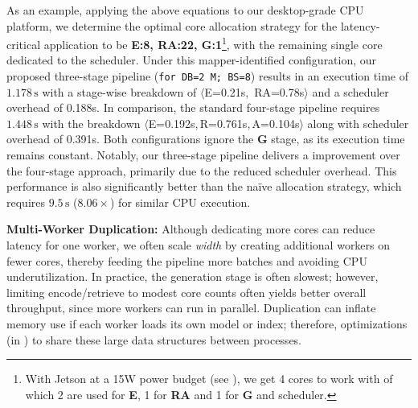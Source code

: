 As an example, applying the above equations to our desktop-grade CPU platform, we determine the optimal core allocation strategy for the latency-critical application to be \textbf{E:8, RA:22, G:1}\footnote{With Jetson at a 15W power budget (see ), we get 4 cores to work with of which 2 are used for \textbf{E}, 1 for \textbf{RA} and 1 for \textbf{G} and scheduler.}, with the remaining single core dedicated to the scheduler. Under this mapper-identified configuration, our proposed three-stage pipeline (\texttt{for DB=2\,M; BS=8}) results in an execution time of $1.178\,\mathrm{s}$ with a stage-wise breakdown of $\langle$E=0.21s,\, RA=0.78s$\rangle$ and a scheduler overhead of 0.188s. In comparison, the standard four-stage pipeline requires $1.448\,\mathrm{s}$ with the breakdown $\langle$E=0.192s,\,R=0.761s,\,A=0.104s$\rangle$ along with scheduler overhead of 0.391s. Both configurations ignore the \textbf{G} stage, as its execution time remains constant. 
Notably, our three-stage pipeline delivers a \new{$1.23\times$} improvement over the four-stage approach, primarily due to the reduced scheduler overhead. This performance is also significantly better than the naïve allocation strategy, which requires $9.5\,\mathrm{s}$ ($8.06\times$) for similar CPU execution.


\noindent\textbf{Multi-Worker Duplication:}
Although dedicating more cores can reduce latency for one worker, we often scale \emph{width} by creating additional workers on fewer cores, thereby feeding the pipeline more batches and avoiding CPU underutilization. In practice, the generation stage is often slowest; 
however, limiting encode/retrieve to modest core counts often yields better overall throughput, since more workers can run in parallel. Duplication can inflate memory use if each worker loads its own model or index; therefore, optimizations (in ) to share these large data structures between processes.


